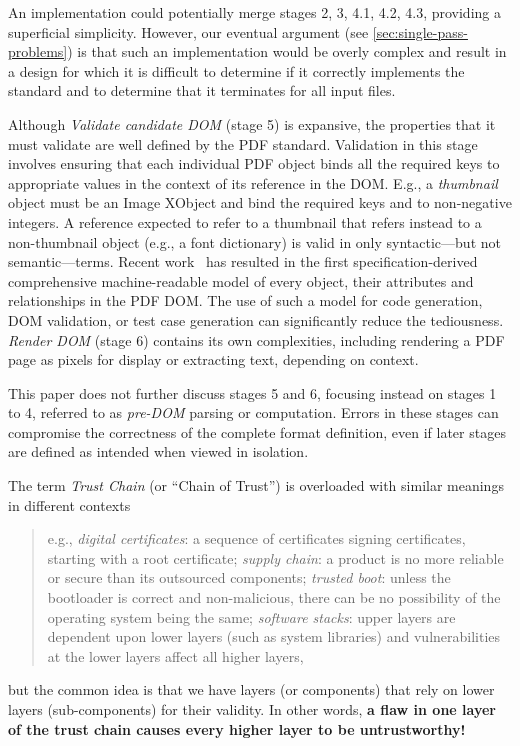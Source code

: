 An implementation could potentially merge stages 2, 3, 4.1, 4.2, 4.3,
providing a superficial simplicity.
%
However, our eventual argument (see \cref{sec:single-pass-problems})
is that such an implementation would be overly complex and result in a
design for which it is difficult to determine if it correctly
implements the standard and to determine that it terminates for all
input files.

%
Although \emph{Validate candidate DOM} (stage 5) is expansive, the
properties that it must validate are well defined by the 
PDF standard.
%
Validation in this stage involves ensuring that each individual PDF
object binds all the required keys to appropriate values in the context
of its reference in the DOM.
%
E.g., a \emph{thumbnail} object must be an Image XObject and bind the
required keys  and  to non-negative
integers.
%
A reference expected to refer to a thumbnail that refers instead to a
non-thumbnail object (e.g., a font dictionary) is valid in only
syntactic---but not semantic---terms.
%
Recent work~\cite{peterwyattArlingtonPDFModel2021} has resulted in the
first specification-derived comprehensive machine-readable model of
every object, their attributes and relationships in the PDF DOM. The
use of such a model for code generation, DOM validation, or test case
generation can significantly reduce the tediousness.
%
\emph{Render DOM} (stage 6) contains its own complexities, including
rendering a PDF page as pixels for display or extracting text,
depending on context.

%
This paper does not further discuss stages 5 and 6, focusing instead
on stages 1 to 4, referred to as \emph{pre-DOM} parsing or
computation.
%
Errors in these stages can compromise the correctness of the complete
format definition, even if later stages are defined as intended when
viewed in isolation.


The term \emph{Trust Chain} (or ``Chain of Trust'') is
overloaded with similar meanings in different contexts
%
%
\begin{quote}
e.g.,
\emph{digital certificates}: a sequence of certificates signing certificates,
starting with a root certificate;
\emph{supply chain}: a product is no more reliable or secure than its
outsourced components;
\emph{trusted boot}: unless the bootloader is correct and non-malicious,
there can be no possibility of the operating system being the same;
\emph{software stacks}: upper layers are dependent upon lower layers (such as
system libraries) and vulnerabilities at the lower layers affect all higher
layers,
\end{quote}
but the common idea is that we have layers (or components) that rely
on lower layers (sub-components) for their validity.  In other words,
{\textbf{a flaw in one layer of the trust chain causes every higher
    layer to be untrustworthy!}}


